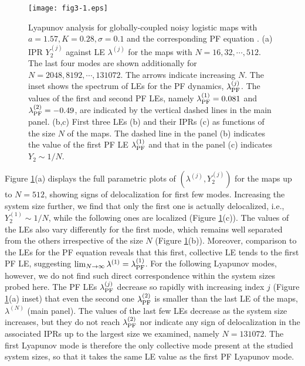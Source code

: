 \documentclass[12pt]{iopart}
\begin{document}
\begin{figure}[t]
 \begin{center}
  \texttt{[image: fig3-1.eps]}
  \caption{Lyapunov analysis for globally-coupled noisy logistic maps  with $a=1.57, K=0.28, \sigma = 0.1$ and the corresponding PF equation . (a) IPR $Y_2^{(j)}$ against LE $\lambda^{(j)}$ for the maps with $N = 16, 32, \cdots, 512$. The last four modes are shown additionally for $N = 2048, 8192, \cdots, 131072$. The arrows indicate increasing $N$. The inset shows the spectrum of LEs for the PF dynamics, $\lambda_{\rm PF}^{(j)}$. The values of the first and second PF LEs, namely $\lambda_{\rm PF}^{(1)} = 0.081$ and $\lambda_{\rm PF}^{(2)} = -0.49$, are indicated by the vertical dashed lines in the main panel. (b,c) First three LEs (b) and their IPRs (c) as functions of the size $N$ of the maps. The dashed line in the panel (b) indicates the value of the first PF LE $\lambda_{\rm PF}^{(1)}$ and that in the panel (c) indicates $Y_2 \sim 1/N$.}
  \label{fig:3-1}
 \end{center}
\end{figure}%

Figure \ref{fig:3-1}(a) displays
 the full parametric plots of $(\lambda^{(j)}, Y_2^{(j)})$
 for the maps up to $N=512$,
 showing signs of delocalization for first few modes.
Increasing the system size further,
 we find that only the first one is actually delocalized, i.e.,
 $Y_2^{(1)} \sim 1/N$,
 while the following ones are localized (Figure \ref{fig:3-1}(c)).
The values of the LEs also vary differently for the first mode,
 which remains well separated from the others
 irrespective of the size $N$ (Figure \ref{fig:3-1}(b)).
Moreover, comparison to the LEs for the PF equation
 reveals that this first, collective LE tends to the first PF LE,
 suggesting $\lim_{N\to\infty} \lambda^{(1)} = \lambda_{\rm PF}^{(1)}$.
For the following Lyapunov modes, however, 
 we do not find such direct correspondence
 within the system sizes probed here.
The PF LEs $\lambda_{\rm PF}^{(j)}$ decrease so rapidly
 with increasing index $j$ (Figure \ref{fig:3-1}(a) inset)
 that even the second one $\lambda_{\rm PF}^{(2)}$
 is smaller than the last LE of the maps, $\lambda^{(N)}$
 (main panel).
The values of the last few LEs decrease as the system size increases,
 but they do not reach $\lambda_{\rm PF}^{(2)}$
 nor indicate any sign of delocalization in the associated IPRs
 up to the largest size we examined, namely $N=131072$.
The first Lyapunov mode is therefore the only collective mode
 present at the studied system sizes,
 so that it takes the same LE value as the first PF Lyapunov mode.
\end{document}
